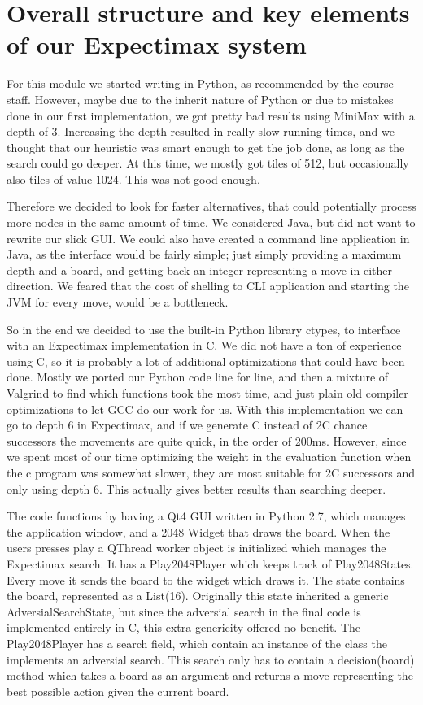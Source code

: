 \section{Overall structure and key elements of our Expectimax system}
For this module we started writing in Python, as recommended by the course
staff. However, maybe due to the inherit nature of Python or due to mistakes
done in our first implementation, we got pretty bad results using MiniMax with a depth of 3.
Increasing the depth resulted in really slow running times, and we thought that our heuristic was smart enough to get the job done, as long as the search could go deeper. At this time, we mostly got tiles of 512, but occasionally also tiles of value 1024. This was not good enough.

Therefore we decided to look for faster alternatives, that could potentially process more nodes in the same amount of time. We considered Java, but did not want to rewrite our slick GUI. We could also have created a command line application in
Java, as the interface would be fairly simple; just simply providing a maximum depth
and a board, and getting back an integer representing a move in either direction. We feared that the
cost of shelling to CLI application and starting the JVM for every move, would
be a bottleneck.

So in the end we decided to use the built-in Python library ctypes, to interface
with an Expectimax implementation in C. We did not have a ton of experience using
C, so it is probably a lot of additional optimizations that could have been done. Mostly we
ported our Python code line for line, and then a mixture of Valgrind to find
which functions took the most time, and just plain old compiler optimizations
to let GCC do our work for us. With this implementation we can go to depth 6
in Expectimax, and if we generate C instead of 2C chance successors the
movements are quite quick, in the order of 200ms. However, since we spent most
of our time optimizing the weight in the evaluation function when the c program
was somewhat slower, they are most suitable for 2C successors and only using depth 6.
This actually gives better results than searching deeper.

The code functions by having a Qt4 GUI written in Python 2.7, which
manages the application window, and a 2048 Widget that draws the board.
When the users presses play a QThread worker object is initialized which
manages the Expectimax search. It has a Play2048Player which keeps track of
Play2048States. Every move it sends the board to the widget which draws it.
The state contains the board, represented as a List(16). Originally this
state inherited a generic AdversialSearchState, but since the adversial
search in the final code is implemented entirely in C, this extra
genericity offered no benefit. The Play2048Player has a search field, which
contain an instance of the class the implements an adversial search. This
search only has to contain a decision(board) method which takes a board
as an argument and returns a move representing the best possible action
given the current board.


